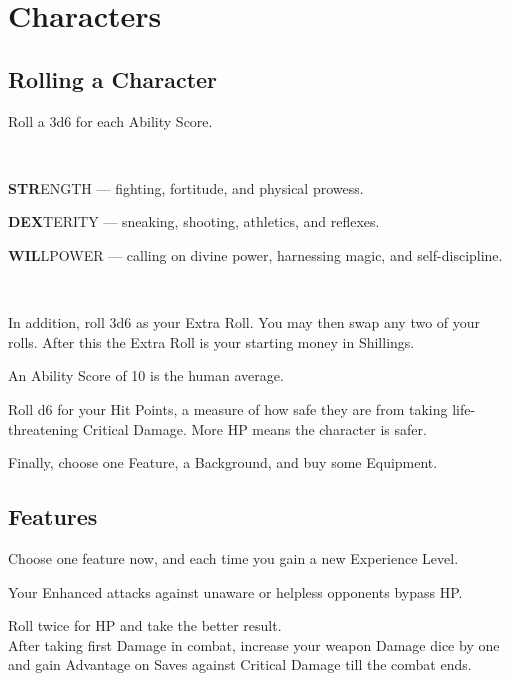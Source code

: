 \documentclass[itdr]{subfiles}
\begin{document}
\chapter{Characters}
\resetHeaders

\section{Rolling a Character}

Roll a 3d6 for each Ability Score.

~

\textbf{STR}ENGTH --- fighting, fortitude, and physical prowess.

\textbf{DEX}TERITY --- sneaking, shooting, athletics, and reflexes.

\textbf{WIL}LPOWER --- calling on divine power, harnessing magic, and self-discipline.

~

In addition, roll 3d6 as your Extra Roll. You may then swap any two of your rolls. After this the Extra Roll is your starting money in Shillings.

An Ability Score of 10 is the human average.

Roll d6 for your Hit Points, a measure of how safe they are from taking life-threatening Critical Damage. More HP means the character is safer.

Finally, choose one Feature, a Background, and buy some Equipment.


\section{Features}

Choose one feature now, and each time you gain a new Experience Level.

Your Enhanced attacks against unaware or helpless opponents bypass HP.

 Roll twice for HP and take the better result.\\
After taking first Damage in combat, increase your weapon Damage dice by one and gain Advantage on Saves against Critical Damage till the combat ends.
\end{document}

